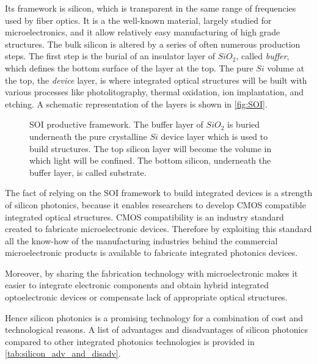 Its framework is silicon, which is transparent in the same range of frequencies used by fiber optics.
It is a the well-known material, largely studied for microelectronics, and it allow relatively easy manufacturing of high grade structures.
The bulk silicon is altered by a series of often numerous production steps.
The first step is the burial of an insulator layer of $SiO_2$, called \textit{buffer}, which defines the bottom surface of the layer at the top.
The pure $Si$ volume at the top, the \textit{device} layer, is where integrated optical structures will be built with various processes like photolitography, thermal oxidation, ion implantation, and etching.
A schematic representation of the layers is shown in \autoref{fig:SOI}.

\begin{figure}[ht]
	\centering
	
	\caption{\acs{SOI} productive framework.
		The buffer layer of $SiO_2$ is buried underneath the pure crystalline $Si$ device layer which is used to build structures.
		The top silicon layer will become the volume in which light will be confined.
		The bottom silicon, underneath the buffer layer, is called substrate.
		}
	\label{fig:SOI}
\end{figure}

The fact of relying on the \acs{SOI} framework to build integrated devices is a strength of silicon photonics, because it enables researchers to develop \acs{CMOS} compatible integrated optical structures.
\ac{CMOS} compatibility is an industry standard created to fabricate microelectronic devices.
Therefore by exploiting this standard all the know-how of the manufacturing industries behind the commercial microelectronic products is available to fabricate integrated photonics devices.

Moreover, by sharing the fabrication technology with microelectronic makes it easier to integrate electronic components and obtain hybrid integrated optoelectronic devices or compensate lack of appropriate optical structures.

Hence silicon photonics is a promising technology for a combination of cost and technological reasons.
A list of advantages and disadvantages of silicon photonics compared to other integrated photonics technologies is provided in \autoref{tab:silicon_adv_and_disadv}.

